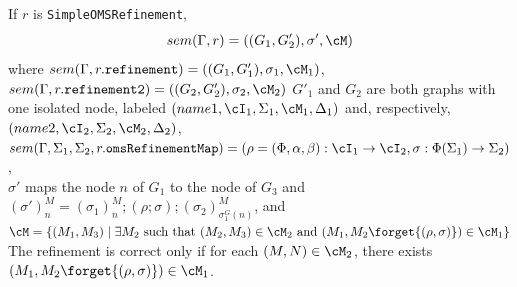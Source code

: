 \documentclass[10pt, a4paper]{isov2}
\newcommand*{\syntax}[1]{\texttt{#1}}
\begin{document}
%

If $r$ is \syntax{SimpleOMSRefinement},
$$sem(\Gamma, r) =
((G_1,G'_2),\sigma', \cM)$$
where
 $sem(\Gamma,  r.\syntax{refinement}) = ((G_1,G'_1), \sigma_1,\cM_1)$,
 $sem(\Gamma,  r.\syntax{refinement2}) = ((G_2, G'_2),\sigma_2, \cM_2)$
 $G'_1$ and $G_2$ are both graphs with one isolated node, labeled
 $(name1,\cI_1,\Sigma_1,\cM_1,\Delta_1)$
 and, respectively,
 $(name2,\cI_2,\Sigma_2,\cM_2,\Delta_2)$,\\
 $sem(\Gamma, \Sigma_1, \Sigma_2, r.\syntax{omsRefinementMap}) = (\rho = (\Phi,\alpha,\beta):\cI_1\to\cI_2,\sigma:\Phi(\Sigma_1)\to\Sigma_2)$,\\
 $\sigma'$ maps the node $n$ of $G_1$ to the node of $G_3$ and
 $(\sigma')^M_n = (\sigma_1)^M_n;(\rho;\sigma);(\sigma_2)^M_{\sigma_1^G(n)}$,
 and $\cM = \{ (M_1, M_3)\mid \exists M_2 \text{ such that }
  (M_2,M_3) \in \cM_2 \text{ and }
  (M_1,M_2\forget{(\rho,\sigma)}) \in \cM_1 \}$
 The refinement is correct only if
 for each $(M,N)\in\cM_2$,
 there exists
 $(M_1,M_2\forget{(\rho,\sigma)})\in \cM_1$.
\end{document}
